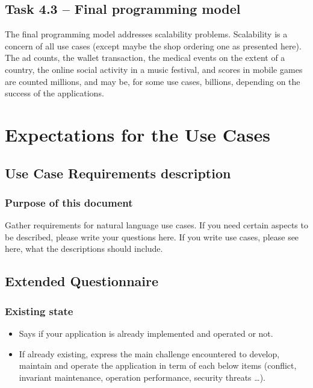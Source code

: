 \documentclass[11pt,a4paper]{report}
\begin{document}
\section{Task 4.3 -- Final programming model}
The final programming model addresses scalability problems. Scalability is a concern of all use cases (except maybe the shop ordering one as presented here). The ad counts, the wallet transaction,  the medical events on the extent of a country, the online social activity in a music festival, and scores in mobile games are counted millions, and may be, for some use cases, billions, depending on the success of the applications. 


%
%
%
%
\printglossaries

\appendix
\chapter{Expectations for the Use Cases}
\section{Use Case Requirements description}
\subsection{Purpose of this document}
Gather requirements for natural language use cases.
If you need certain aspects to be described, please write your questions here.
If you write use cases, please see here, what the descriptions should include.

\section{Extended Questionnaire}

\subsection{Existing state}
\begin{itemize}
\item Says if your application is already implemented and operated or not.
\item If already existing, express the main challenge encountered to develop, maintain and operate the application in term of each below items (conflict, invariant maintenance, operation performance, security threats …).
\end{itemize}
\end{document}
